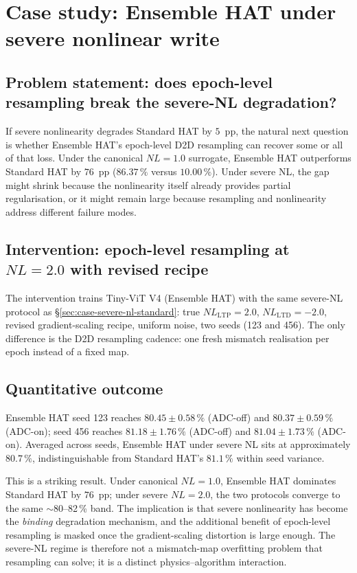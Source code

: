 \section{Case study: Ensemble HAT under severe nonlinear write}
\label{sec:case-severe-nl-ensemble}

\subsection{Problem statement: does epoch-level resampling break the severe-NL degradation?}

If severe nonlinearity degrades Standard HAT by $5$~pp, the natural next question is whether Ensemble HAT's epoch-level D2D resampling can recover some or all of that loss.  Under the canonical $NL=1.0$ surrogate, Ensemble HAT outperforms Standard HAT by $76$~pp ($86.37\,\%$ versus $10.00\,\%$).  Under severe NL, the gap might shrink because the nonlinearity itself already provides partial regularisation, or it might remain large because resampling and nonlinearity address different failure modes.

\subsection{Intervention: epoch-level resampling at $NL=2.0$ with revised recipe}

The intervention trains Tiny-ViT V4 (Ensemble HAT) with the same severe-NL protocol as \S\ref{sec:case-severe-nl-standard}: true $NL_{\mathrm{LTP}}=2.0$, $NL_{\mathrm{LTD}}=-2.0$, revised gradient-scaling recipe, uniform noise, two seeds (123 and 456).  The only difference is the D2D resampling cadence: one fresh mismatch realisation per epoch instead of a fixed map.

\subsection{Quantitative outcome}

Ensemble HAT seed 123 reaches $80.45\pm0.58\,\%$ (ADC-off) and $80.37\pm0.59\,\%$ (ADC-on); seed 456 reaches $81.18\pm1.76\,\%$ (ADC-off) and $81.04\pm1.73\,\%$ (ADC-on).  Averaged across seeds, Ensemble HAT under severe NL sits at approximately $80.7\,\%$, indistinguishable from Standard HAT's $81.1\,\%$ within seed variance.

This is a striking result.  Under canonical $NL=1.0$, Ensemble HAT dominates Standard HAT by $76$~pp; under severe $NL=2.0$, the two protocols converge to the same $\sim$80--82\,\% band.  The implication is that severe nonlinearity has become the \emph{binding} degradation mechanism, and the additional benefit of epoch-level resampling is masked once the gradient-scaling distortion is large enough.  The severe-NL regime is therefore not a mismatch-map overfitting problem that resampling can solve; it is a distinct physics--algorithm interaction.

